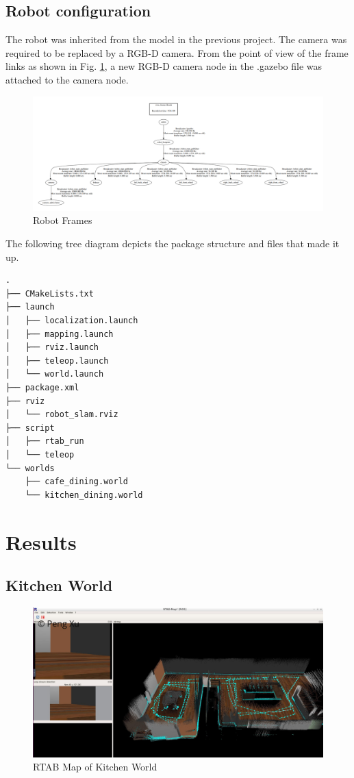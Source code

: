 \documentclass[10pt,journal,compsoc]{IEEEtran}
\begin{document}
\subsection{Robot configuration}

The robot was inherited from the model in the previous project. The camera was required to be replaced by a RGB-D camera. From the point of view of the frame links as shown in Fig. \ref{fig:bot-frames}, a new RGB-D camera node in the .gazebo file was attached to the camera node.

\begin{figure}[thpb]
      \centering
      \includegraphics[width=\linewidth]{images/frames.png}
      \caption{Robot Frames}
      \label{fig:bot-frames}
\end{figure}

The following tree diagram depicts the package structure and files that made it up.

\begin{lstlisting}
.
├── CMakeLists.txt
├── launch
│   ├── localization.launch
│   ├── mapping.launch
│   ├── rviz.launch
│   ├── teleop.launch
│   └── world.launch
├── package.xml
├── rviz
│   └── robot_slam.rviz
├── script
│   ├── rtab_run
│   └── teleop
└── worlds
    ├── cafe_dining.world
    └── kitchen_dining.world
\end{lstlisting}

\section{Results}

\subsection{Kitchen World}

\begin{figure}[thpb]
      \centering
      \includegraphics[width=\linewidth]{images/kitchen-rtab-map.png}
      \caption{RTAB Map of Kitchen World}
      \label{fig:kitchen-rtab-map}
\end{figure}
\end{document}
